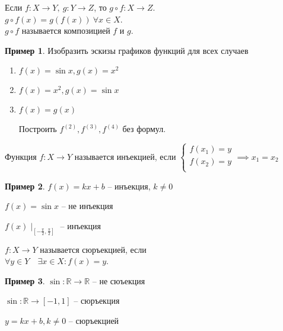 \documentclass{book}
\newcommand\R{\ensuremath{\mathbb{R}}}
\theoremstyle{definition}
\newtheorem*{example}{Пример}
\begin{document}
    \begin{definition}
        Если $f:X\to Y,\ g:Y\to Z$, то $g\circ f:X\to Z$.\\
        $g\circ f(x) = g(f(x))\ \forall x\in X$.\\
        $g\circ f$ называется композицией $f$ и $g$.
    \end{definition}
    \begin{example}
        Изобразить эскизы графиков функций для всех случаев
    \begin{enumerate}
        \item $f(x) = \sin  x, g(x) = x^2$
        \item $f(x) = x^2, g(x) = \sin  x$
        \item $f(x) = g(x)$


    Построить $f^{(2)}, f^{(3)}, f^{(4)}$ без формул.
    \end{enumerate}
    \end{example}
    
    \begin{definition}
        Функция $f:X\to Y$ называется инъекцией, если 
        $\begin{cases}
        f(x_1) = y\\
        f(x_2) = y\\
        \end{cases} \implies  x_1=x_2$
    \end{definition}
    \begin{example}
    $f(x) = kx+b$ -- инъекция, $k\neq 0$

        $f(x) = \sin x$ -- не инъекция

    $f(x)\mid_{[-\frac{\pi}{2}, \frac{\pi}{2}]  }$ -- инъекция
    \end{example}
    
    \begin{definition}
        $f:X\to Y$ называется сюръекцией, если\\
        $\forall y\in Y\quad \exists x\in X:f(x) = y$.
    \end{definition}
    \begin{example}
        $\sin :\R\to \R$ -- не сюъекция

        $\sin :\R\to [-1,1]$ -- сюръекция

        $y = kx+b, k\neq 0$ -- сюръекцией
    \end{example}
\end{document}
